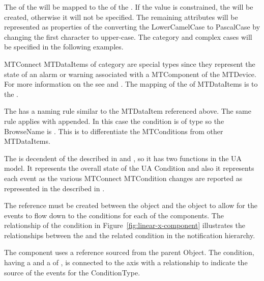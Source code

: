 The  of the  will be mapped to the   of the . If the value is constrained, the  will be created, otherwise it will not be specified. The remaining attributes will be represented as properties of the  converting the \gls{LowerCamelCase} to \gls{PascalCase} by changing the first character to upper-case. The  category and complex cases will be specified in the following examples.

MTConnect \glspl{MTDataItem} of \gls{category}  are special types since they represent the state of an alarm or warning associated with a \gls{MTComponent} of the \gls{MTDevice}. For more information on the  see \cite{MTCPart2} and \cite{MTCPart3}. The mapping of the   of \glspl{MTDataItem} is to the .

The  has a naming rule similar to the \gls{MTDataItem} referenced above. The same rule applies with  appended. In this case the condition is of \gls{type}  so the \gls{BrowseName} is . This is to differentiate the \glspl{MTCondition} from other \glspl{MTDataItem}.

The  is decendent of the  described in \cite{UAPart5} and \cite{UAPart9}, so it has two functions in the UA model. It represents the overall state of the UA \gls{Condition} and also it represents each event as the various MTConnect \gls{MTCondition} changes are reported as represented in the  described in \cite{MTCPart3}.

The  reference must be created between the  object and the  object to allow for the events to flow down to the conditions for each of the components. The relationship of the condition in Figure~\ref{fig:linear-x-component} illustrates the relationships between the  and the related condition in the notification hierarchy.

The  component uses a  reference sourced from the parent  \gls{Object}. The condition, having a  and a  of , is connected to the  axis with a  relationship to indicate the source of the events for the \gls{ConditionType}.

